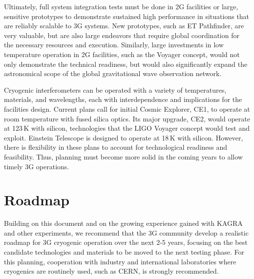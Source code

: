 Ultimately, full system integration tests must be done in 2G facilities or large, sensitive prototypes to demonstrate sustained high performance in situations that are reliably scalable to 3G systems. New prototypes, such as ET Pathfinder, are very valuable, but are also large endeavors that require global coordination for the necessary resources and execution. Similarly, large investments in low temperature operation in 2G facilities, such as the Voyager concept, would not only demonstrate the technical readiness, but would also significantly expand the astronomical scope of the global gravitational wave observation network. 


Cryogenic interferometers can be operated with a variety of temperatures, materials, and wavelengths, each with interdependence and implications for the facilities design. Current plans call for initial Cosmic Explorer, CE1, to operate at room temperature with fused silica optics. Its major upgrade, CE2, would operate at 123\,K with silicon, technologies that the LIGO Voyager concept would test and exploit. Einstein Telescope is designed to operate at 18\,K with silicon. However, there is flexibility in these plans to account for technological readiness and feasibility. Thus, planning must become more solid in the coming years to allow timely 3G operations. 

\section{Roadmap}
Building on this document and on the growing experience gained with KAGRA and other experiments, we recommend that the 3G community develop a realistic roadmap for 3G cryogenic operation over the next 2-5 years, focusing on the best candidate technologies and materials to be moved to the next testing phase. For this planning, cooperation with industry and international laboratories where cryogenics are routinely used, such as CERN, is strongly recommended.

